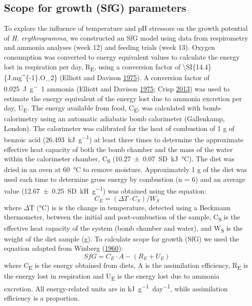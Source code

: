 \documentclass[a4paper,10pt, oneside]{memoir}
\begin{document}
\hypertarget{scope-for-growth-sfg-parameters}{%
\subsection{Scope for growth (SfG) parameters}\label{scope-for-growth-sfg-parameters}}

To explore the influence of temperature and pH stressors on the growth potential of \textit{H. erythrogramma}, we constructed an SfG model using data from respirometry and ammonia analyses (week 12) and feeding trials (week 13).
Oxygen consumption was converted to energy equivalent values to calculate the energy lost in respiration per day, \si{R_E}, using a conversion factor of \textbackslash{}SI\{14.4\}\{J.mg\^{}\{-1\}.O\_2\} (Elliott and Davison \protect\hyperlink{ref-Elliott1975}{1975}).
A conversion factor of \SI{0.025}{J.g^-1} ammonia (Elliott and Davison \protect\hyperlink{ref-Elliott1975}{1975}; Crisp \protect\hyperlink{ref-Crisp2013}{2013}) was used to estimate the energy equivalent of the energy lost due to ammonia excretion per day, U\textsubscript{E}.
The energy available from food, \si{C_E}, was calculated with bomb-calorimetry using an automatic adiabatic bomb calorimeter (Gallenkamp, London).
The calorimeter was calibrated for the heat of combustion of 1 g of benzoic acid (\SI{26.493}{kJ.g^{-1}}) at least three times to determine the approximate effective heat capacity of both the bomb chamber and the mass of the water within the calorimeter chamber, \si{C_S} (\SI{10.27(007)}{SD.kJ.\celsius}).
The diet was dried in an oven at \SI{60}{\celsius} to remove moisture.
Approximately 1 g of the diet was used each time to determine gross energy by combustion (n = 6) and an average value (\SI{12.67(025)}{SD.kH.g^{-1}}) was obtained using the equation:
\[C_E=(\Delta T \cdot C_S)/W_S\]
where \(\Delta\)T (\si{\celsius}) is is the change in temperature, detected using a Beckmann thermometer, between the initial and post-combustion of the sample, \si{C_S} is the effective heat capacity of the system (bomb chamber and water), and \si{W_S} is the weight of the diet sample (g).
To calculate scope for growth (SfG) we used the equation adapted from Winberg (\protect\hyperlink{ref-Winberg1960}{1960}):
\[SfG=C_E \cdot A-(R_E+U_E)\]
where \si{C_E} is the energy obtained from diets, A is the assimilation efficiency, \si{R_E} is the energy lost in respiration and \si{U_E} is the energy lost due to ammonia excretion.
All energy-related units are in \si{kJ.g^{-1}.day^{-1}}, while assimilation efficiency is a proportion.
\end{document}
